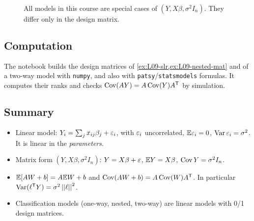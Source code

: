 \begin{figure}[ht]
\centering
{}
\caption{All models in this course are special cases of $(Y,X\beta,\sigma^2I_n)$. They differ only in the design matrix.}
\label{fig:L09-family}
\end{figure}

\subsection{Computation}
The notebook  builds the design matrices of
\cref{ex:L09-slr,ex:L09-nested-mat} and of a two-way model with \texttt{numpy}, and also with
\texttt{patsy}/\texttt{statsmodels} formulas. It computes their ranks and checks
$\operatorname{Cov}(AY)=A\operatorname{Cov}(Y)A^{\mathsf T}$ by simulation.

\subsection{Summary}
\begin{itemize}
  \item Linear model: $Y_i=\sum_j x_{ij}\beta_j+\varepsilon_i$, with $\varepsilon_i$ uncorrelated, $\mathbb E\varepsilon_i=0$, $\operatorname{Var}\varepsilon_i=\sigma^2$. It is linear in the \emph{parameters}.
  \item Matrix form $(Y,X\beta,\sigma^2I_n)$: $Y=X\beta+\varepsilon$, $\mathbb E Y=X\beta$, $\operatorname{Cov} Y=\sigma^2I_n$.
  \item $\mathbb E[AW+b]=A\mathbb E W+b$ and $\operatorname{Cov}(AW+b)=A\operatorname{Cov}(W)A^{\mathsf T}$. In particular $\operatorname{Var}(\ell^{\mathsf T} Y)=\sigma^2\left|\left|\ell\right|\right|^2$.
  \item Classification models (one-way, nested, two-way) are linear models with 0/1 design matrices.
\end{itemize}


